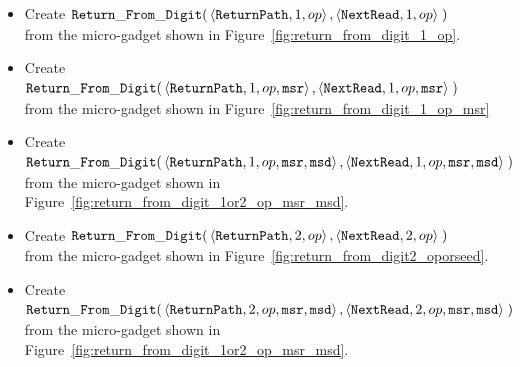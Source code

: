\begin{itemize}

    \item Create
    $\begin{aligned}[t]
        {\tt Return\_From\_Digit}(& \left\langle {\tt ReturnPath},    1, op \right\rangle,
                           \left\langle {\tt NextRead}, 1, op \right\rangle \;)
    \end{aligned}$\\from the micro-gadget shown in Figure~\ref{fig:return_from_digit_1_op}.

    \item Create
    $\begin{aligned}[t]
        {\tt Return\_From\_Digit}(& \left\langle {\tt ReturnPath},    1, op, {\tt msr} \right\rangle,
                           \left\langle {\tt NextRead}, 1, op, {\tt msr} \right\rangle \;)
    \end{aligned}$\\from the micro-gadget shown in Figure~\ref{fig:return_from_digit_1_op_msr}

    \item Create
    $\begin{aligned}[t]
        {\tt Return\_From\_Digit}(& \left\langle {\tt ReturnPath},    1, op, {\tt msr}, {\tt msd} \right\rangle,
                           \left\langle {\tt NextRead}, 1, op, {\tt msr}, {\tt msd} \right\rangle \;)
    \end{aligned}$\\from the micro-gadget shown in Figure~\ref{fig:return_from_digit_1or2_op_msr_msd}.



    \item Create
    $\begin{aligned}[t]
        {\tt Return\_From\_Digit}(& \left\langle {\tt ReturnPath},    2, op \right\rangle,
                           \left\langle {\tt NextRead}, 2, op \right\rangle \;)
    \end{aligned}$\\from the micro-gadget shown in Figure~\ref{fig:return_from_digit2_oporseed}.

    \item Create
    $\begin{aligned}[t]
        {\tt Return\_From\_Digit}(& \left\langle {\tt ReturnPath},    2, op, {\tt msr}, {\tt msd} \right\rangle,
                           \left\langle {\tt NextRead}, 2, op, {\tt msr}, {\tt msd} \right\rangle \;)
    \end{aligned}$\\from the micro-gadget shown in Figure~\ref{fig:return_from_digit_1or2_op_msr_msd}.




\end{itemize}
